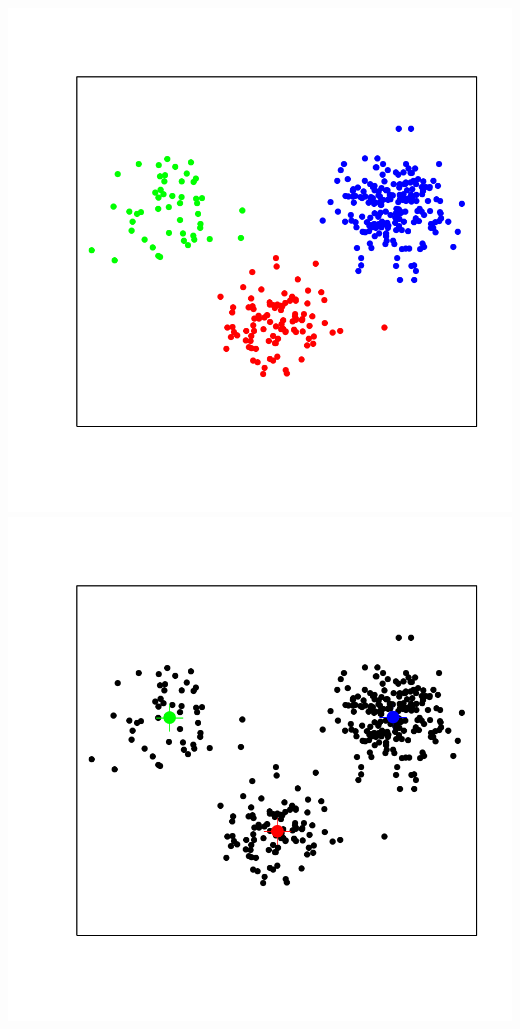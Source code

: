 \documentclass[landscape,footrule]{foils}
\begin{document}
\centerline{
\includegraphics[scale=0.6]{kmeans-3}\hspace*{-1.7cm}\includegraphics[scale=0.6]{kmeans-4}
\vspace*{-3.2cm}}
\end{document}
